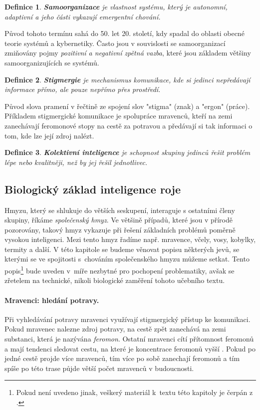 \documentclass[a4paper,12pt]{article}
\newtheorem{define}{Definice}
\begin{document}
\begin{define}
  {\bf Samoorganizace} je vlastnost systému, který je autonomní, adaptivní a jeho 
  části vykazují emergentní chování. \cite{Wuchner07}
\end{define}
Původ tohoto termínu sahá do 50. let 20. století, kdy spadal do oblasti obecné teorie
systémů a kybernetiky. Často jsou v souvislosti se samoorganizací zmiňovány pojmy
{\it pozitivní a negativní zpětná vazba}, které jsou základem většiny samoorganizujících
se systémů.

\begin{define}
  {\bf Stigmergie} je mechanismus komunikace, kde si jedinci nepředávají informace přímo,
  ale pouze nepřímo přes prostředí. \cite[s.6]{Heylighen99}
\end{define}
Původ slova pramení v řečtině ze spojení slov "stigma" (znak) a "ergon" (práce). Příkladem
stigmergické komunikace je spolupráce mravenců, kteří na zemi zanechávají feromonové stopy
na cestě za potravou a předávají si tak informaci o tom, kde lze její zdroj nalézt.

\begin{define}
  {\bf Kolektivní inteligence} je schopnost skupiny jedinců řešit problém lépe nebo kvalitněji,
  než by jej řešil jednotlivec. \cite[s.1]{Heylighen99}
\end{define}


\subsection{Biologický základ inteligence roje}
Hmyzu, který se shlukuje do větších seskupení, interaguje s ostatními členy skupiny,
říkáme {\it společenský hmyz}. Ve většině případů, které jsou v přírodě pozorovány,
takový hmyz vykazuje při řešení základních problémů poměrně vysokou inteligenci. Mezi
tento hmyz řadíme např. mravence, včely, vosy, kobylky, termity a další. V této
kapitole se budeme věnovat popisu některých jevů, se kterými se ve spojitosti s~chováním
společenského hmyzu můžeme setkat. Tento popis\footnote{Pokud není uvedeno jinak, veškerý
materiál k~textu této kapitoly je čerpán z \cite{Beekman08SwarmBio}.} bude uveden v~míře
nezbytné pro pochopení problematiky, avšak se zřetelem na technické, nikoli biologické
zaměření tohoto učebního textu.

\paragraph{Mravenci: hledání potravy.}
Při vyhledávání potravy mravenci využívají stigmergický přístup ke komunikaci. Pokud mravenec
nalezne zdroj potravy, na cestě zpět zanechává na zemi substanci, která je nazývána {\it feromon}.
Ostatní mravenci cítí přítomnost feromonů a mají tendenci sledovat cestu, na které je koncentrace
feromonů vyšší \cite{Dorigo06antcolony}. Pokud po jedné cestě projde více mravenců, tím více po
sobě zanechají feromonů a tím spíše po této trase půjde větší počet mravenců v budoucnosti.
\end{document}
